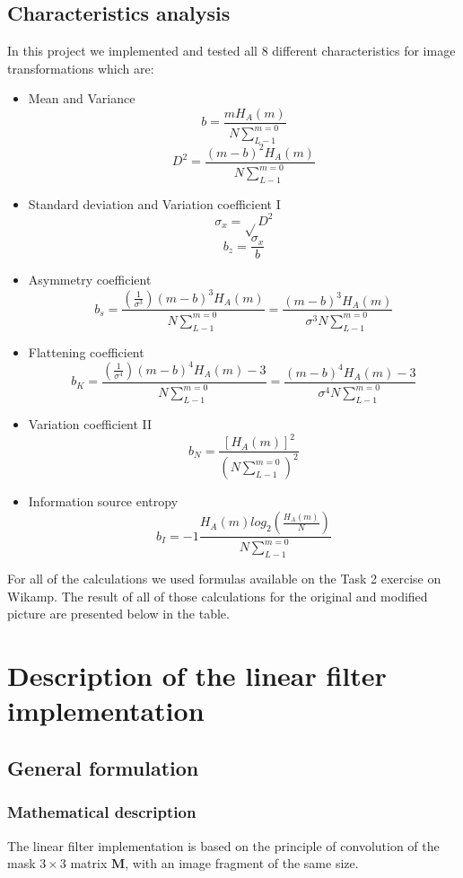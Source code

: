 \documentclass[12pt]{article}
\begin{document}
\subsection{Characteristics analysis}

In this project we implemented and tested all 8 different characteristics for image transformations which are:
\begin{itemize}
  \item Mean and Variance
  \[ b=\frac{mH_A(m)}{N\sum_{L-1}^{m=0}}\]
   \[ D^2=\frac{(m-b)^2H_A(m)}{N\sum_{L-1}^{m=0}}\]
  \item Standard deviation and Variation coefficient I
   \[ \sigma _x=\sqrt{}D^{2}\]
    \[ b_z= \frac{\sigma _x}{b}\]
  \item Asymmetry coefficient
   \[ b_s=\frac{(\frac{1}{\sigma ^3})(m-b)^3H_A(m)}{N\sum_{L-1}^{m=0}} = \frac{(m-b)^3H_A(m)}{\sigma ^3N\sum_{L-1}^{m=0}}\]
  \item Flattening coefficient
   \[ b_K=\frac{(\frac{1}{\sigma ^4})(m-b)^4H_A(m)-3}{N\sum_{L-1}^{m=0}} = \frac{(m-b)^4H_A(m)-3}{\sigma ^4N\sum_{L-1}^{m=0}}
\]
  \item Variation coefficient II
   \[ b_N=\frac{[H_A(m)]^2}{(N\sum_{L-1}^{m=0})^2}\]
  \item Information source entropy
   \[ b_I=-1\frac{H_A(m)log_2(\frac{H_A(m)}{N})}{N\sum_{L-1}^{m=0}}\]
\end{itemize}

For all of the calculations we used formulas available on the Task 2 exercise on Wikamp. The result of all of those calculations for the original and modified picture are presented below in the table.

\section{Description of the linear filter implementation}

\subsection{General formulation}

\subsubsection{Mathematical description}

The linear filter implementation is based on the principle of convolution of the mask $3\times3$ matrix $\mathbf{M}$, with an image fragment of the same size.
\end{document}
